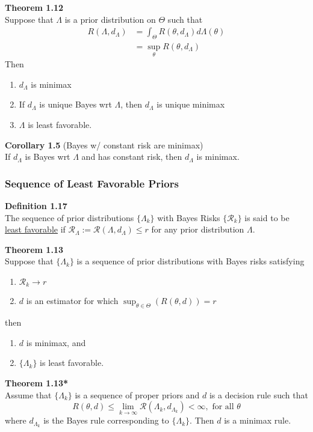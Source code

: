 \documentclass[12pt]{article}
\numberwithin{equation}{section}
\begin{document}
\textbf{Theorem 1.12} \\
Suppose that $\Lambda$ is a prior distribution on $\Theta$ such that
\begin{align*}
  R(\Lambda, d_{\Lambda}) &= \int_{\Theta} R(\theta, d_{\Lambda}) d \Lambda(\theta) \\
  &= \sup_{\theta} R(\theta, d_{\Lambda})
\end{align*}
Then
\begin{enumerate}
  \item $d_{\Lambda}$ is minimax 
  \item If $d_{\Lambda}$ is unique Bayes wrt $\Lambda$, then $d_{\Lambda}$ is unique minimax
  \item $\Lambda$ is least favorable. 
\end{enumerate}

\textbf{Corollary 1.5} (Bayes w/ constant risk are minimax) \\
If $d_{\Lambda}$ is Bayes wrt $\Lambda$ and has constant risk, then $d_{\Lambda}$ is minimax.

\subsubsection{Sequence of Least Favorable Priors}
\textbf{Definition 1.17} \\
The sequence of prior distributions $\{ \Lambda_k \}$ with Bayes Risks $\{ \mathcal{R}_k \}$ is said to be \underline{least favorable} if
$\mathcal{R}_{\Lambda} := \mathcal{R}(\Lambda, d_{\Lambda}) \le r$ for any prior distribution $\Lambda$.

\textbf{Theorem 1.13} \\
Suppose that $\{\Lambda_k \}$ is a sequence of prior distributions with Bayes risks satisfying
\begin{enumerate}
  \item $\mathcal{R}_k \to r$
  \item $d$ is an estimator for which $\sup_{\theta \in \Theta} (R(\theta, d)) = r$
\end{enumerate}
then
\begin{enumerate}
  \item $d$ is minimax, and
  \item $\{ \Lambda_k \}$ is least favorable.
\end{enumerate}

\textbf{Theorem 1.13*} \\
Assume that $\{\Lambda_k\}$ is a sequence of proper priors and $d$ is a decision rule such that
\begin{equation*}
  R(\theta, d) \le \lim_{k \to \infty} \mathcal{R}(\Lambda_k, d_{\Lambda_k}) < \infty, \text{  for all } \theta
\end{equation*}
where $d_{\Lambda_k}$ is the Bayes rule corresponding to $\{ \Lambda_k \}$. Then $d$ is a minimax rule.
\end{document}
